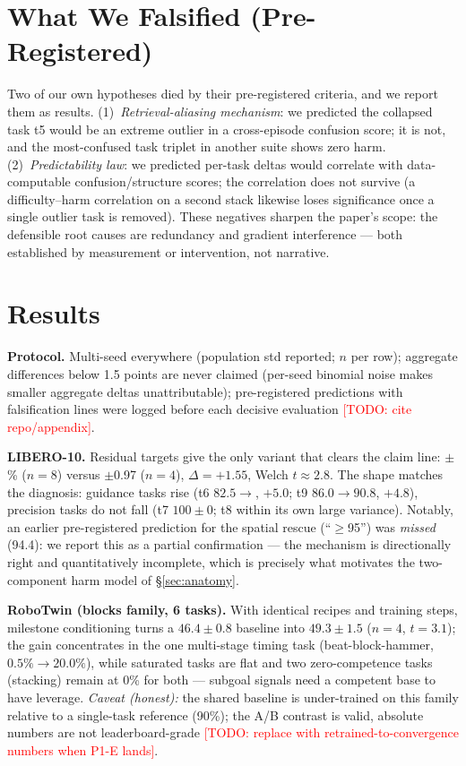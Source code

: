 \documentclass[conference]{IEEEtran}
\newcommand{\todo}[1]{\textcolor{red}{[TODO: #1]}}
\begin{document}
\section{What We Falsified (Pre-Registered)}
\label{sec:falsified}
Two of our own hypotheses died by their pre-registered criteria, and we
report them as results. (1)~\emph{Retrieval-aliasing mechanism}: we
predicted the collapsed task t5 would be an extreme outlier in a
cross-episode confusion score; it is not, and the most-confused task
triplet in another suite shows zero harm. (2)~\emph{Predictability law}:
we predicted per-task deltas would correlate with data-computable
confusion/structure scores; the correlation does not survive
(a difficulty--harm correlation on a second stack likewise loses
significance once a single outlier task is removed). These negatives
sharpen the paper's scope: the defensible root causes are redundancy
and gradient interference --- both established by measurement or
intervention, not narrative.

\section{Results}\label{sec:results}
\textbf{Protocol.} Multi-seed everywhere (population std reported;
$n$ per row); aggregate differences below 1.5 points are never claimed
(per-seed binomial noise makes smaller aggregate deltas
unattributable); pre-registered predictions with falsification lines
were logged before each decisive evaluation \todo{cite repo/appendix}.

\textbf{LIBERO-10.} Residual targets give the only variant that clears
the claim line: \aggResid$\pm$\aggResidStd\% ($n{=}8$) versus
\aggBaselineArmB$\pm$0.97 ($n{=}4$), $\Delta{=}{+}1.55$, Welch
$t\!\approx\!2.8$. The shape matches the diagnosis: guidance tasks rise
(t6 $82.5\to$\tSixResid, $+5.0$; t9 $86.0\to90.8$, $+4.8$), precision
tasks do not fall (t7 $100\pm0$; t8 within its own large variance).
Notably, an earlier pre-registered prediction for the spatial rescue
(``$\geq$95'') was \emph{missed} (94.4): we report this as a partial
confirmation --- the mechanism is directionally right and
quantitatively incomplete, which is precisely what motivates the
two-component harm model of \S\ref{sec:anatomy}.

\textbf{RoboTwin (blocks family, 6 tasks).} With identical recipes and
training steps, milestone conditioning turns a $46.4\pm0.8$ baseline
into $49.3\pm1.5$ ($n{=}4$, $t{=}3.1$); the gain concentrates in the
one multi-stage timing task (beat-block-hammer, $0.5\%\to20.0\%$),
while saturated tasks are flat and two zero-competence tasks (stacking)
remain at 0\% for both --- subgoal signals need a competent base to
have leverage. \emph{Caveat (honest):} the shared baseline is
under-trained on this family relative to a single-task reference
(90\%); the A/B contrast is valid, absolute numbers are not
leaderboard-grade \todo{replace with retrained-to-convergence numbers
when P1-E lands}.
\end{document}
